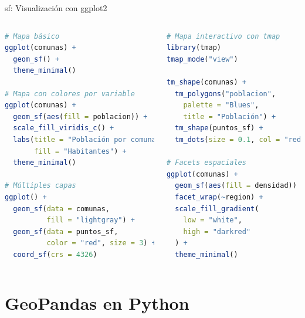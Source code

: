 \documentclass[10pt,aspectratio=169]{beamer}
\begin{document}
\begin{frame}[fragile]{sf: Visualización con ggplot2}
    \begin{columns}[T]
        \begin{lstlisting}[language=R]
# Mapa básico
ggplot(comunas) +
  geom_sf() +
  theme_minimal()

# Mapa con colores por variable
ggplot(comunas) +
  geom_sf(aes(fill = poblacion)) +
  scale_fill_viridis_c() +
  labs(title = "Población por comuna",
       fill = "Habitantes") +
  theme_minimal()

# Múltiples capas
ggplot() +
  geom_sf(data = comunas, 
          fill = "lightgray") +
  geom_sf(data = puntos_sf, 
          color = "red", size = 3) +
  coord_sf(crs = 4326)
        \end{lstlisting}
        
        \begin{lstlisting}[language=R]
# Mapa interactivo con tmap
library(tmap)
tmap_mode("view")

tm_shape(comunas) +
  tm_polygons("poblacion",
    palette = "Blues",
    title = "Población") +
  tm_shape(puntos_sf) +
  tm_dots(size = 0.1, col = "red")

# Facets espaciales
ggplot(comunas) +
  geom_sf(aes(fill = densidad)) +
  facet_wrap(~region) +
  scale_fill_gradient(
    low = "white", 
    high = "darkred"
  ) +
  theme_minimal()
        \end{lstlisting}
    \end{columns}
\end{frame}

\section{GeoPandas en Python}
\end{document}
